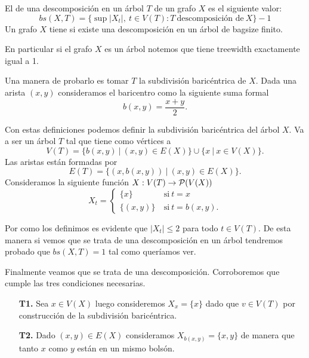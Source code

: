 \documentclass[tesis.tex]{subfiles}
\begin{document}
\begin{deff}
	El  de una descomposición en un árbol $T$ de un grafo $X$ es el siguiente valor:
	\begin{equation*}
		bs(X,T) = \{ \sup |X_t|, \ t \in V(T) : T \ \text{descomposición de} \ X  \} - 1
	\end{equation*}
	Un grafo $X$ tiene  si existe una descomposición en un árbol de bagsize finito.	
\end{deff}
\begin{ej}\label{desc-arbol-arbol}
	En particular si el grafo $X$ es un árbol notemos que tiene treewidth exactamente igual a 1.
	
	Una manera de probarlo es tomar $T$ la subdivisión baricéntrica de $X$. 
	Dada una arista $(x,y)$ consideramos el baricentro como la siguiente suma formal
	\[
		b(x,y)  = \frac{x+y}{2}.
	\]
	

	Con estas definiciones podemos definir la subdivisión baricéntrica del árbol $X$.
	Va a ser un árbol $T$ tal que tiene como vértices a 
	\[
	V(T) = \{ b(x,y) \ | \ (x,y) \in E(X) \} \cup \{  x \ | \ x \in V(X)  \}.
	\]
	Las aristas están formadas por 
	\[
	E(T) = \{  (x,b(x,y)) \ | \ (x,y) \in E(X) \}.
	\]
	Consideramos la siguiente función $X: V(T) \to {\cal P}(V(X))$  
	\[
		X_t = 
		\begin{cases}
			\{ x \} \ & \text{si} \ t = x 				\\
			\{ (x,y)  \} \ &\text{si} \ t = b(x,y).
		\end{cases}
	\]
	
	Por como los definimos es evidente que $|X_t| \le 2$ para todo $t \in V(T)$.
	De esta manera si vemos que se trata de una descomposición en un árbol tendremos probado que $bs(X,T) = 1$ tal como queríamos ver.
	
	Finalmente veamos que se trata de una descomposición. Corroboremos que cumple las tres condiciones necesarias.
	\begin{enumerate}
		\item[\textbf{T1.}] 
		Sea $x \in V(X)$ luego consideremos $X_x = \{ x \}$ dado que $v \in V(T)$ por construcción de la subdivisión baricéntrica.
		
		\item[\textbf{T2.}] 
		Dado $(x,y) \in E(X)$ consideramos $X_{b(x,y)} = \{ x,y \} $ de manera que tanto $x$ como $y$ están en un mismo bolsón.
		

\end{enumerate}
\end{ej}
\end{document}
